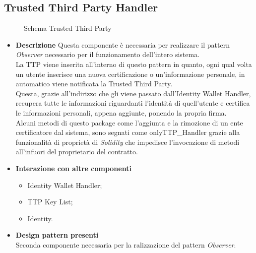 \subsection{Trusted Third Party Handler}
\begin{figure}[!h]
	\centering
	\caption{Schema Trusted Third Party}
\end{figure}
\begin{itemize}
	\item \textbf{Descrizione}
	Questa componente è necessaria per realizzare il pattern \textit{Observer} necessario per il funzionamento dell'intero sistema.\\
	La \gls{TTP} viene inserita all'interno di questo pattern in quanto, ogni qual volta un utente inserisce una nuova certificazione o un'informazione personale, in automatico viene notificata la Trusted Third Party.\\
	Questa, grazie all'indirizzo che gli viene passato dall'Identity Wallet Handler, recupera tutte le informazioni riguardanti l'identità di quell'utente e certifica le informazioni personali, appena aggiunte, ponendo la propria firma.\\
	Alcuni metodi di questo package come l'aggiunta e la rimozione di un ente certificatore dal sistema, sono segnati come onlyTTP\_Handler grazie alla funzionalità di proprietà di \textit{Solidity} che impedisce l'invocazione di metodi all'infuori del proprietario del contratto.
	\item \textbf{Interazione con altre componenti}
	\begin{itemize}
		\item Identity Wallet Handler;
		\item TTP Key List;
		\item Identity.
	\end{itemize}
	\item \textbf{Design pattern presenti}\\
	Seconda componente necessaria per la ralizzazione del pattern \textit{Observer}.
\end{itemize}
